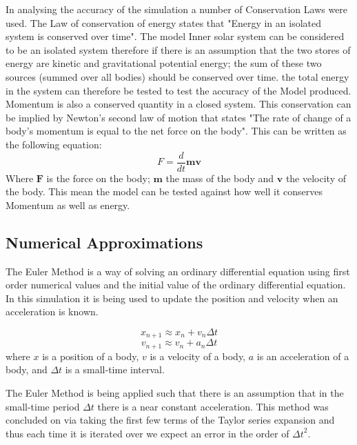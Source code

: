 \documentclass[a4paper,10pt]{article}
\begin{document}
In analysing the accuracy of the simulation a number of Conservation Laws were used. The Law of conservation of energy states that "Energy in an isolated system is conserved over time". The model Inner solar system can be considered to be an isolated system therefore if there is an assumption that the two stores of energy are kinetic and gravitational potential energy; the sum of these two sources (summed over all bodies) should be conserved over time. the total energy in the system can therefore be tested to test the accuracy of the Model produced. Momentum is also a conserved quantity in a closed system. This conservation can be implied by Newton's second law of motion \cite{SLOM} that states "The rate of change of a body's momentum is equal to the net force on the body".
This can be written as the following equation:
\begin{equation}
    F = \frac {d}{dt}\boldsymbol{mv} \label{eq:Newton's Second Law of Motion}
\end{equation}
Where $\boldsymbol F$ is the force on the body; $\boldsymbol m$ the mass of the body and $\boldsymbol v$ the velocity of the body.
This mean the model can be tested against how well it conserves Momentum as well as energy.

\subsection{Numerical Approximations} 

The Euler Method is a way of solving an ordinary differential equation using first order numerical values and the initial value of the ordinary differential equation. In this simulation it is being used to update the position and velocity when an acceleration is known.


\begin{equation}
    x_{n+1} \approx x_{n} + v_{n}\Delta t \label{eq:Euler 1}
\end{equation}
\begin{equation}
    v_{n+1} \approx v_{n} + a_{n}\Delta t\label{eq:Euler 2}
\end{equation}
where $x$ is a position of a body, $v$ is a velocity of a body, $a$ is an acceleration of a body, and $\Delta t$ is a small-time interval.

The Euler Method is being applied such that there is an assumption that in the small-time period $\Delta t$ there is a near constant acceleration. This method was concluded on via taking the first few terms of the Taylor series expansion \cite{taylor series} and thus each time it is iterated over we expect an error in the order of ${\Delta t}^2$.
\end{document}
